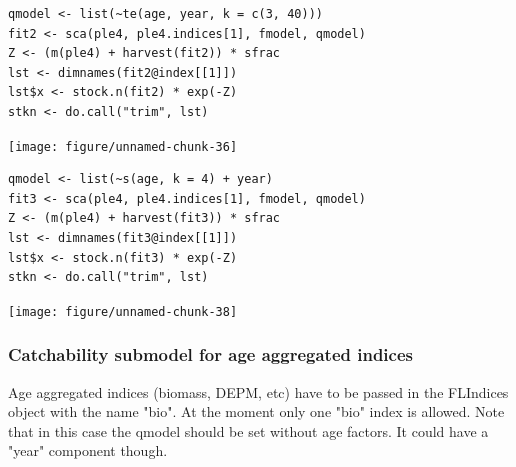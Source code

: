 \documentclass[a4paper,english,10pt]{article}\usepackage[]{graphicx}\usepackage[]{color}
\makeatletter
\newenvironment{kframe}{%
 \def\at@end@of@kframe{}%
 \ifinner\ifhmode%
  \def\at@end@of@kframe{\end{minipage}}%
  \begin{minipage}{\columnwidth}%
 \fi\fi%
 \def\FrameCommand##1{\hskip\@totalleftmargin \hskip-\fboxsep
 \colorbox{shadecolor}{##1}\hskip-\fboxsep
     \hskip-\linewidth \hskip-\@totalleftmargin \hskip\columnwidth}%
 \MakeFramed {\advance\hsize-\width
   \@totalleftmargin\z@ \linewidth\hsize
   \@setminipage}}%
 {\par\unskip\endMakeFramed%
 \at@end@of@kframe}
\newenvironment{knitrout}{}{} %
\makeatother
\begin{document}
\begin{knitrout}
\color{fgcolor}\begin{kframe}
\begin{verbatim}
qmodel <- list(~te(age, year, k = c(3, 40)))
fit2 <- sca(ple4, ple4.indices[1], fmodel, qmodel)
Z <- (m(ple4) + harvest(fit2)) * sfrac
lst <- dimnames(fit2@index[[1]])
lst$x <- stock.n(fit2) * exp(-Z)
stkn <- do.call("trim", lst)
\end{verbatim}
\end{kframe}
\end{knitrout}


\begin{knitrout}
\color{fgcolor}

{\centering \texttt{[image: figure/unnamed-chunk-36]} 

}



\end{knitrout}


\begin{knitrout}
\color{fgcolor}\begin{kframe}
\begin{verbatim}
qmodel <- list(~s(age, k = 4) + year)
fit3 <- sca(ple4, ple4.indices[1], fmodel, qmodel)
Z <- (m(ple4) + harvest(fit3)) * sfrac
lst <- dimnames(fit3@index[[1]])
lst$x <- stock.n(fit3) * exp(-Z)
stkn <- do.call("trim", lst)
\end{verbatim}
\end{kframe}
\end{knitrout}


\begin{knitrout}
\color{fgcolor}

{\centering \texttt{[image: figure/unnamed-chunk-38]} 

}



\end{knitrout}


\subsubsection{Catchability submodel for age aggregated indices}

Age aggregated indices (biomass, DEPM, etc) have to be passed in the FLIndices object with the name "bio". At the moment only one "bio" index is allowed. Note that in this case the qmodel should be set without age factors. It could have a "year" component though. 
\end{document}
